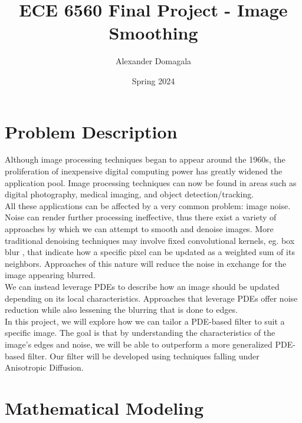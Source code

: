\documentclass{article}
\title{\textbf{ECE 6560 Final Project - Image Smoothing}}
\author{Alexander Domagala}
\date{Spring 2024}
\begin{document}
  \maketitle

  \section{Problem Description}
  Although image processing techniques began to appear around the 1960s, the proliferation of inexpensive
  digital computing power has greatly widened the application pool. Image processing techniques
  can now be found in areas such as digital photography, medical imaging, and object detection/tracking.\\

  \noindent
  All these applications can be affected by a very common problem: image noise.
  Noise can render further processing ineffective, thus there exist a variety of approaches by which
  we can attempt to smooth and denoise images. More traditional denoising techniques
  may involve fixed convolutional kernels, eg. box blur \cite{Convolution}, that indicate how a specific pixel
  can be updated as a weighted sum of its neighbors. Approaches of this nature will reduce the noise in
  exchange for the image appearing blurred.\\

  \noindent
  We can instead leverage PDEs to describe how an image should be updated depending on its local characteristics.
  Approaches that leverage PDEs offer noise reduction while also lessening the blurring that is done to edges.\\

  \noindent
  In this project, we will explore how we can tailor a PDE-based filter to suit a specific image.
  The goal is that by understanding the characteristics of the image's edges and noise, we
  will be able to outperform a more generalized PDE-based filter. Our filter will be developed
  using techniques falling under Anisotropic Diffusion.



  \newpage
  \section{Mathematical Modeling}
\end{document}
